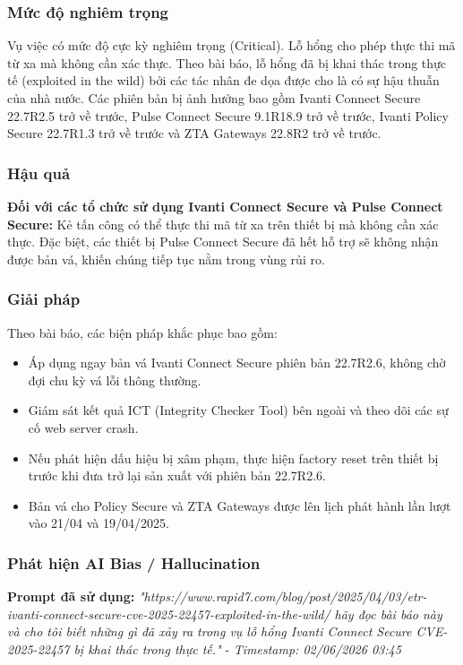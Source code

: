 \subsubsection{Mức độ nghiêm trọng}
Vụ việc có mức độ cực kỳ nghiêm trọng (Critical). Lỗ hổng cho phép thực thi mã từ xa mà không cần xác thực. Theo bài báo, lỗ hổng đã bị khai thác trong thực tế (exploited in the wild) bởi các tác nhân đe dọa được cho là có sự hậu thuẫn của nhà nước. Các phiên bản bị ảnh hưởng bao gồm Ivanti Connect Secure 22.7R2.5 trở về trước, Pulse Connect Secure 9.1R18.9 trở về trước, Ivanti Policy Secure 22.7R1.3 trở về trước và ZTA Gateways 22.8R2 trở về trước.

\subsubsection{Hậu quả}
\textbf{Đối với các tổ chức sử dụng Ivanti Connect Secure và Pulse Connect Secure:} Kẻ tấn công có thể thực thi mã từ xa trên thiết bị mà không cần xác thực. Đặc biệt, các thiết bị Pulse Connect Secure đã hết hỗ trợ sẽ không nhận được bản vá, khiến chúng tiếp tục nằm trong vùng rủi ro.

\subsubsection{Giải pháp}
Theo bài báo, các biện pháp khắc phục bao gồm:

\begin{itemize}
    \item Áp dụng ngay bản vá Ivanti Connect Secure phiên bản 22.7R2.6, không chờ đợi chu kỳ vá lỗi thông thường.
    \item Giám sát kết quả ICT (Integrity Checker Tool) bên ngoài và theo dõi các sự cố web server crash.
    \item Nếu phát hiện dấu hiệu bị xâm phạm, thực hiện factory reset trên thiết bị trước khi đưa trở lại sản xuất với phiên bản 22.7R2.6.
    \item Bản vá cho Policy Secure và ZTA Gateways được lên lịch phát hành lần lượt vào 21/04 và 19/04/2025.
\end{itemize}

\subsubsection{Phát hiện AI Bias / Hallucination}
\textbf{Prompt đã sử dụng:} \textit{"{https://www.rapid7.com/blog/post/2025/04/03/etr-ivanti-connect-secure-cve-2025-22457-exploited-in-the-wild/} hãy đọc bài báo này và cho tôi biết những gì đã xảy ra trong vụ lỗ hổng Ivanti Connect Secure CVE-2025-22457 bị khai thác trong thực tế."} - \textit{Timestamp: 02/06/2026 03:45}

